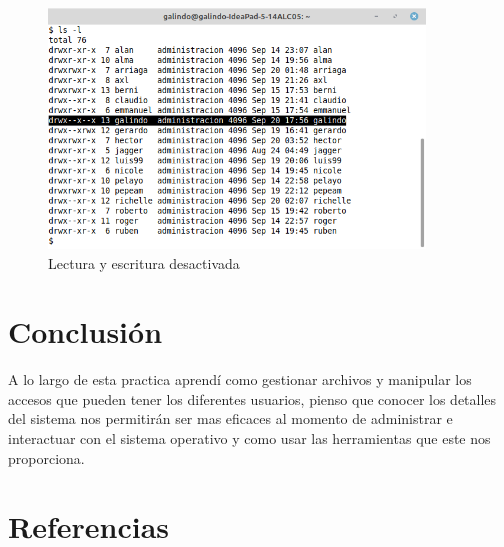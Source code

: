 \documentclass[11pt]{article}
\begin{document}
\begin{figure}[htbp]
\centering
\includegraphics[width=10cm]{img/b2.png}
\caption{Lectura y escritura desactivada}
\end{figure}


\section{Conclusión}
\label{sec:orgdc04485}
A lo largo de esta practica aprendí como gestionar archivos y manipular los 
accesos que pueden tener los diferentes usuarios, pienso que conocer los 
detalles del sistema nos permitirán ser mas eficaces al momento de administrar
e interactuar con el sistema operativo y como usar las herramientas que este 
nos proporciona.

\section{Referencias}
\label{sec:org54ae829}
\printbibliography[heading=none]
\end{document}
